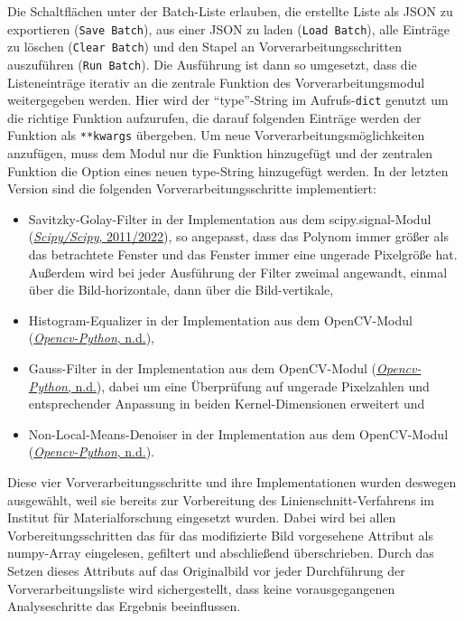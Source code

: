 \documentclass[
  12pt,
]{book}
\begin{document}
Die Schaltflächen unter der Batch-Liste erlauben, die erstellte Liste als JSON zu exportieren (\texttt{Save\ Batch}), aus einer JSON zu laden (\texttt{Load\ Batch}), alle Einträge zu löschen (\texttt{Clear\ Batch}) und den Stapel an Vorverarbeitungsschritten auszuführen (\texttt{Run\ Batch}).
Die Ausführung ist dann so umgesetzt, dass die Listeneinträge iterativ an die zentrale Funktion des Vorverarbeitungsmodul weitergegeben werden. Hier wird der ``type''-String im Aufrufs-\texttt{dict} genutzt um die richtige Funktion aufzurufen, die darauf folgenden Einträge werden der Funktion als \texttt{**kwargs} übergeben. Um neue Vorverarbeitungsmöglichkeiten anzufügen, muss dem Modul nur die Funktion hinzugefügt und der zentralen Funktion die Option eines neuen type-String hinzugefügt werden.
In der letzten Version sind die folgenden Vorverarbeitungsschritte implementiert:

\begin{itemize}
\item
  Savitzky-Golay-Filter in der Implementation aus dem scipy.signal-Modul (\protect\hyperlink{ref-ScipyScipy2022}{\emph{Scipy/Scipy}, 2011/2022}), so angepasst, dass das Polynom immer größer als das betrachtete Fenster und das Fenster immer eine ungerade Pixelgröße hat. Außerdem wird bei jeder Ausführung der Filter zweimal angewandt, einmal über die Bild-horizontale, dann über die Bild-vertikale,
\item
  Histogram-Equalizer in der Implementation aus dem OpenCV-Modul (\protect\hyperlink{ref-OpencvpythonWrapperPackage}{\emph{Opencv-Python}, n.d.}),
\item
  Gauss-Filter in der Implementation aus dem OpenCV-Modul (\protect\hyperlink{ref-OpencvpythonWrapperPackage}{\emph{Opencv-Python}, n.d.}), dabei um eine Überprüfung auf ungerade Pixelzahlen und entsprechender Anpassung in beiden Kernel-Dimensionen erweitert und
\item
  Non-Local-Means-Denoiser in der Implementation aus dem OpenCV-Modul (\protect\hyperlink{ref-OpencvpythonWrapperPackage}{\emph{Opencv-Python}, n.d.}).
\end{itemize}

Diese vier Vorverarbeitungsschritte und ihre Implementationen wurden deswegen ausgewählt, weil sie bereits zur Vorbereitung des Linienschnitt-Verfahrens im Institut für Materialforschung eingesetzt wurden. Dabei wird bei allen Vorbereitungsschritten das für das modifizierte Bild vorgesehene Attribut als numpy-Array eingelesen, gefiltert und abschließend überschrieben. Durch das Setzen dieses Attributs auf das Originalbild vor jeder Durchführung der Vorverarbeitungsliste wird sichergestellt, dass keine vorausgegangenen Analyseschritte das Ergebnis beeinflussen.
\end{document}
